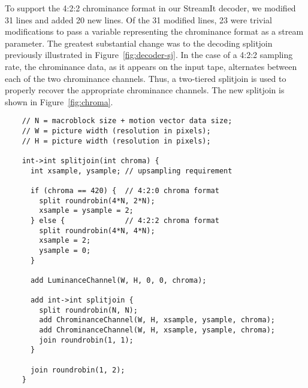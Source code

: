 To support the 4:2:2 chrominance format in our StreamIt decoder, we
modified 31 lines and added 20 new lines. Of the 31 modified lines, 23
were trivial modifications to pass a variable representing the
chrominance format as a stream parameter. The greatest substantial
change was to the decoding splitjoin previously illustrated in
Figure~\ref{fig:decoder-sj}. In the case of a 4:2:2 sampling rate,
the chrominance data, as it appears on the input tape, alternates
between each of the two chrominance channels. Thus, a two-tiered
splitjoin is used to properly recover the appropriate chrominance
channels. The new splitjoin is shown in Figure~\ref{fig:chroma}.
\begin{figure*}[t]
 \begin{minipage}[t]{4.3in}
   {
    \begin{scriptsize}
    \begin{verbatim} 
    // N = macroblock size + motion vector data size;
    // W = picture width (resolution in pixels);
    // H = picture width (resolution in pixels);

    int->int splitjoin(int chroma) {
      int xsample, ysample; // upsampling requirement

      if (chroma == 420) {  // 4:2:0 chroma format
        split roundrobin(4*N, 2*N);
        xsample = ysample = 2;
      } else {              // 4:2:2 chroma format
        split roundrobin(4*N, 4*N);
        xsample = 2;
        ysample = 0;
      }

      add LuminanceChannel(W, H, 0, 0, chroma);

      add int->int splitjoin {
        split roundrobin(N, N);
        add ChrominanceChannel(W, H, xsample, ysample, chroma);
        add ChrominanceChannel(W, H, xsample, ysample, chroma);
        join roundrobin(1, 1);
      }

      join roundrobin(1, 2);
    }
    \end{verbatim}
    \end{scriptsize}
   }
  \end{minipage}
  ~~\vrule~~
  \begin{minipage}[t]{2.0in}
  {
   \begin{center}
   \end{center}
  }
  \end{minipage}
  \caption{Decoding stream to handle 4:2:0 and 4:2:2 chroma
    formats. Figures on right illustrate how macroblock orderings
    differ.}
  \label{fig:chroma}
\end{figure*}



